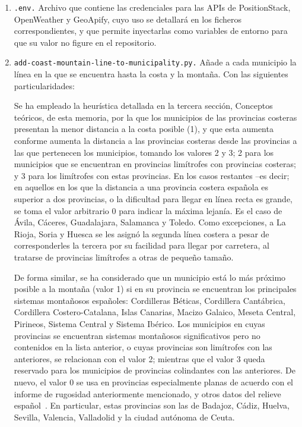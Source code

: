 \begin{enumerate}
    \item \texttt{.env.} Archivo que contiene las credenciales para las APIs de PositionStack, OpenWeather y GeoApify, cuyo uso se detallará en los ficheros correspondientes, y que permite inyectarlas como variables de entorno para que su valor no figure en el repositorio.
    
    \item \texttt{add-coast-mountain-line-to-municipality.py.} Añade a cada municipio la línea en la que se encuentra hasta la costa y la montaña. Con las siguientes particularidades:

    Se ha empleado la heurística detallada en la tercera sección, \guillemotleft Conceptos teóricos\guillemotright, de esta memoria, por la que los municipios de las provincias costeras presentan la menor distancia a la costa posible (1), y que esta aumenta conforme aumenta la distancia a las provincias costeras desde las provincias a las que pertenecen los municipios, tomando los valores 2 y 3; 2 para los municipios que se encuentran en provincias limítrofes con provincias costeras; y 3 para los limítrofes con estas provincias. En los casos restantes –es decir; en aquellos en los que la distancia a una provincia costera española es superior a dos provincias, o la dificultad para llegar en línea recta es grande, se toma el valor arbitrario 0 para indicar la máxima lejanía. Es el caso de Ávila, Cáceres, Guadalajara, Salamanca y Toledo. Como excepciones, a La Rioja, Soria y Huesca se les asignó la segunda línea costera a pesar de corresponderles la tercera por su facilidad para llegar por carretera, al tratarse de provincias limítrofes a otras de pequeño tamaño.

    De forma similar, se ha considerado que un municipio está lo más próximo posible a la montaña (valor 1) si en su provincia se encuentran los principales sistemas montañosos españoles: Cordilleras Béticas, Cordillera Cantábrica, Cordillera Costero-Catalana, Islas Canarias, Macizo Galaico, Meseta Central, Pirineos, Sistema Central y Sistema Ibérico. Los municipios en cuyas provincias se encuentran sistemas montañosos significativos pero no contenidos en la lista anterior, o cuyas provincias son limítrofes con las anteriores, se relacionan con el valor 2; mientras que el valor 3 queda reservado para los municipios de provincias colindantes con las anteriores. De nuevo, el valor 0 se usa en provincias especialmente planas de acuerdo con el informe de rugosidad anteriormente mencionado, y otros datos del relieve español~\cite{relieve}. En particular, estas provincias son las de Badajoz, Cádiz, Huelva, Sevilla, Valencia, Valladolid y la ciudad autónoma de Ceuta.
    

\end{enumerate}
